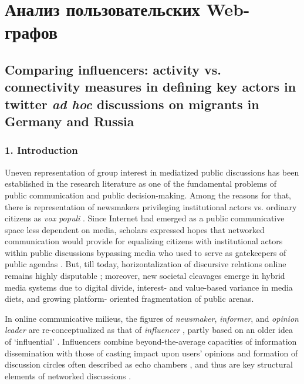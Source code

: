 \section{Анализ пользовательских Web-графов}\label{sec:ch2/sec4}

\subsection{Comparing influencers: activity vs. connectivity measures in defining key actors in twitter \textit{ad hoc} discussions on migrants in Germany and Russia}\label{subsec:ch2/sec4/sub3}

\subsubsection{1. Introduction}

Uneven representation of group interest in mediatized public discussions has been established in the research literature \cite{Nieminen} as one of the fundamental problems of public communication and public decision-making. Among the reasons for that, there is representation of newsmakers privileging institutional actors vs. ordinary citizens as \textit{vox populi} \cite{ScheufeleTewksbury}. Since Internet had emerged as a public communicative space less dependent on media, scholars expressed hopes that networked communication would provide for equalizing citizens with institutional actors within public discussions \cite{White1997} bypassing media who used to serve as gatekeepers of public agendas \cite{White1950}. But, till today, horizontalization of discursive relations online remains highly disputable \cite{Fuchs}; moreover, new societal cleavages emerge in hybrid media systems \cite{Chadwick} due to digital divide, interest- and value-based variance in media diets, and growing platform- oriented fragmentation of public arenas.

In online communicative milieus, the figures of \textit{newsmaker}, \textit{informer}, and \textit{opinion leader} are re-conceptualized as that of \textit{influencer} \cite{PattersonGrennyMaxfield}, partly based on an older idea of ‘influential’ \cite{Rogers}. Influencers combine beyond-the-average capacities of information dissemination with those of casting impact upon users’ opinions and formation of discussion circles often described as echo chambers \cite{Wallsten}, and thus are key structural elements of networked discussions \cite{Castells2007,BakshyRosennMarlow}.

